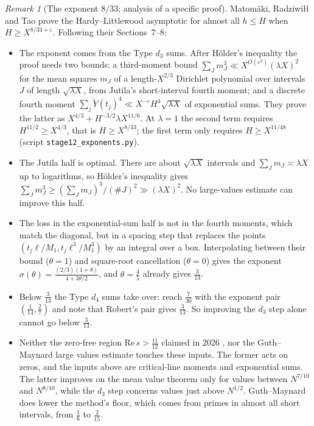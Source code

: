 \documentclass[11pt]{amsart}
\theoremstyle{definition}
\theoremstyle{remark}
\newtheorem{remark}[theorem]{Remark}
\begin{document}
\begin{remark}[The exponent $8/33$; analysis of a specific proof]\label{rem:MRT}
Matomäki, Radziwi\l{}\l{} and Tao \cite{MRT19} prove the Hardy--Littlewood asymptotic for almost all $h\le H$ when $H\ge X^{8/33+\varepsilon}$. Following their Sections~7--8:
\begin{itemize}
\item The exponent comes from the Type $d_3$ sums. After Hölder's inequality the proof needs two bounds: a third-moment bound $\sum_Jm_J^3\ll X^{O(\varepsilon^2)}(\lambda X)^2$ for the mean squares $m_J$ of a length-$X^{2/3}$ Dirichlet polynomial over intervals $J$ of length $\sqrt{\lambda X}$, from Jutila's short-interval fourth moment; and a discrete fourth moment $\sum_j\tilde Y(t_j)^4\ll X^{-\varepsilon}H^4\sqrt{\lambda X}$ of exponential sums. They prove the latter as $X^{4/3}+H^{-3/2}\lambda X^{11/6}$. At $\lambda=1$ the second term requires $H^{11/2}\ge X^{4/3}$, that is $H\ge X^{8/33}$; the first term only requires $H\ge X^{11/48}$ (script \texttt{stage12\_exponents.py}).
\item The Jutila half is optimal. There are about $\sqrt{\lambda X}$ intervals and $\sum_Jm_J\asymp\lambda X$ up to logarithms, so Hölder's inequality gives $\sum_Jm_J^3\ge(\sum_Jm_J)^3/(\#J)^2\gg(\lambda X)^2$. No large-values estimate can improve this half.
\item The loss in the exponential-sum half is not in the fourth moments, which match the diagonal, but in a spacing step that replaces the points $(t_j\ell/M_1,t_j\ell^3/M_1^3)$ by an integral over a box. Interpolating between their bound ($\theta=1$) and square-root cancellation ($\theta=0$) gives the exponent $\sigma(\theta)=\frac{(2/3)(1+\theta)}{4+3\theta/2}$, and $\theta=\frac45$ already gives $\frac3{13}$.
\item Below $\frac3{13}$ the Type $d_4$ sums take over: \cite{MRT19} reach $\frac7{30}$ with the exponent pair $(\frac1{14},\frac27)$ and note that Robert's pair gives $\frac3{13}$. So improving the $d_3$ step alone cannot go below $\frac3{13}$.
\item Neither the zero-free region $\mathrm{Re}\,s>\frac{11}{12}$ claimed in 2026 \cite{OpenAI26}, nor the Guth--Maynard large values estimate \cite{GM25} touches these inputs. The former acts on zeros, and the inputs above are critical-line moments and exponential sums. The latter improves on the mean value theorem only for values between $N^{7/10}$ and $N^{8/10}$, while the $d_3$ step concerns values just above $N^{1/2}$. Guth--Maynard does lower the method's floor, which comes from primes in almost all short intervals, from $\frac16$ to $\frac2{15}$.
\end{itemize}
\end{remark}
\end{document}
